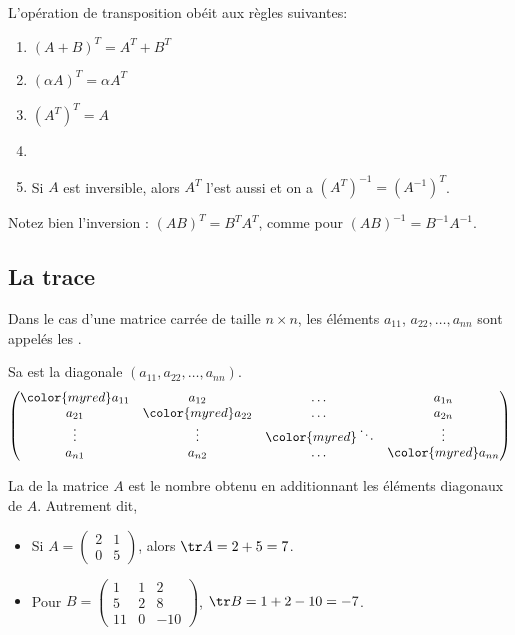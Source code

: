 \documentclass[class=report,crop=false]{standalone}
\begin{document}
L'opération de transposition obéit aux règles suivantes:
\begin{theoreme}
\sauteligne
 \begin{enumerate}
    \item $(A + B)^T = A^T + B^T$
    \item $(\alpha A)^T = \alpha A^T $
    \item $(A^T)^T = A$
    \item {}
    \item Si $A$ est inversible, alors $A^T$ l'est aussi et on a $(A^T)^{-1}=(A^{-1})^T$.
  \end{enumerate}
\label{theotranspo}
\end{theoreme}

Notez bien l'inversion : $(AB)^T = B^T A^T$,
comme pour $(AB)^{-1} = B^{-1} A^{-1}$.


\subsection{La trace}

Dans le cas d'une matrice carrée de taille $n\times n$,
les éléments $a_{11}$, $a_{22}, \ldots, a_{nn}$ sont appelés les .

Sa  est la
diagonale $(a_{11},a_{22}, \ldots, a_{nn})$.
  \[
\begin{pmatrix}
 {\color{myred}a_{11}} & a_{12} & \dots & a_{1n}\\
 a_{21} & {\color{myred}a_{22}} & \dots & a_{2n}\\
 \vdots& \vdots & {\color{myred}\ddots}  & \vdots\\
 a_{n1} & a_{n2} & \dots & {\color{myred}a_{nn}}
\end{pmatrix}
 \]


\begin{definition}
La  de la matrice $A$ est
le nombre obtenu en additionnant les éléments diagonaux de $A$.
Autrement dit,
\end{definition}

\begin{exemple}
\sauteligne
\begin{itemize}
  \item Si
$ A = \left( \begin{smallmatrix}
2 & 1\\
0& 5
\end{smallmatrix}\right)$,
alors $\tr A = 2 + 5 = 7$.

  \item Pour $B = \left(\begin{smallmatrix}
1 & 1 &2\\
5&2&8\\
11 & 0 & -10
\end{smallmatrix}\right)$,  $\tr B = 1 + 2 -10 =-7$.
\end{itemize}
\end{exemple}
\end{document}
